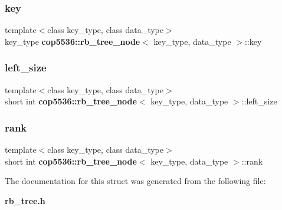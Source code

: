 \mbox{\label{structcop5536_1_1rb__tree__node_aa976b5b194ebbd5d0a1542febc9578aa}} 
\subsubsection{key}
{\footnotesize\ttfamily template$<$class key\+\_\+type, class data\+\_\+type$>$ \\
key\+\_\+type \textbf{ cop5536\+::rb\+\_\+tree\+\_\+node}$<$ key\+\_\+type, data\+\_\+type $>$\+::key}

\mbox{\label{structcop5536_1_1rb__tree__node_ad3214b42bc71cee98fd96d332b841f56}} 
\subsubsection{left\_size}
{\footnotesize\ttfamily template$<$class key\+\_\+type, class data\+\_\+type$>$ \\
short int \textbf{ cop5536\+::rb\+\_\+tree\+\_\+node}$<$ key\+\_\+type, data\+\_\+type $>$\+::left\+\_\+size}

\mbox{\label{structcop5536_1_1rb__tree__node_a21eca6b4b58a2dfc29abf71c0c8330eb}} 
\subsubsection{rank}
{\footnotesize\ttfamily template$<$class key\+\_\+type, class data\+\_\+type$>$ \\
short int \textbf{ cop5536\+::rb\+\_\+tree\+\_\+node}$<$ key\+\_\+type, data\+\_\+type $>$\+::rank}



The documentation for this struct was generated from the following file\+:\begin{DoxyCompactItemize}
\item 
\textbf{ rb\+\_\+tree.\+h}\end{DoxyCompactItemize}
